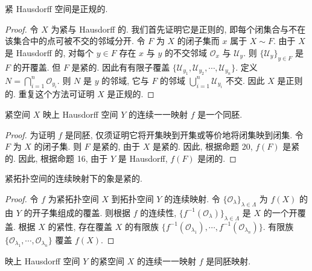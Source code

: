 \documentclass[../../main.tex]{subfiles}
\begin{document}
\begin{theorem}\label{theorem:ch11-紧Hausdorff正规}
紧 Hausdorff 空间是正规的.
\end{theorem}

\begin{proof}
令 $X$ 为紧与 Hausdorff 的. 我们首先证明它是正则的, 即每个闭集合与不在该集合中的点可被不交的邻域分开. 令 $F$ 为 $X$ 的闭子集而 $x$ 属于 $X\sim F$. 由于 $X$ 是 Hausdorff 的, 对每个 $y\in F$ 存在 $x$ 与 $y$ 的不交邻域 $\mathcal{O}_{x}$ 与 $\mathcal{U}_{y}$. 则 $\{\mathcal{U}_{y}\}_{y\in F}$ 是 $F$ 的开覆盖. 但 $F$ 是紧的. 因此有有限子覆盖 $\{\mathcal{U}_{y_{1}},\mathcal{U}_{y_{2}},\cdots,\mathcal{U}_{y_{n}}\}$. 定义 $N=\bigcap_{i=1}^{n}\mathcal{O}_{y_{i}}$. 则 $N$ 是 $y$ 的邻域, 它与 $F$ 的邻域 $\bigcup_{i=1}^{n}\mathcal{U}_{y_{i}}$ 不交. 因此 $X$ 是正则的. 重复这个方法可证明 $X$ 是正规的.
\end{proof}

\begin{proposition}\label{proposition:ch11-紧到Hausdorff一一同胚}
紧空间 $X$ 映上 Hausdorff 空间 $Y$ 的连续一一映射 $f$ 是一个同胚.
\end{proposition}

\begin{proof}
为证明 $f$ 是同胚, 仅须证明它将开集映到开集或等价地将闭集映到闭集. 令 $F$ 为 $X$ 的闭子集. 则 $F$ 是紧的, 由于 $X$ 是紧的. 因此, 根据命题 20, $f(F)$ 是紧的. 因此, 根据命题 16, 由于 $Y$ 是 Hausdorff, $f(F)$ 是闭的.
\end{proof}

\begin{proposition}\label{proposition:ch11-紧连续象}
紧拓扑空间的连续映射下的象是紧的.
\end{proposition}

\begin{proof}
令 $f$ 为紧拓扑空间 $X$ 到拓扑空间 $Y$ 的连续映射. 令 $\{\mathcal{O}_{\lambda}\}_{\lambda\in\Lambda}$ 为 $f(X)$ 的由 $Y$ 的开子集组成的覆盖. 则根据 $f$ 的连续性, $\{f^{-1}(\mathcal{O}_{\lambda})\}_{\lambda\in\Lambda}$ 是 $X$ 的一个开覆盖. 根据 $X$ 的紧性, 存在覆盖 $X$ 的有限族 $\{f^{-1}(\mathcal{O}_{\lambda_{1}}),\cdots,f^{-1}(\mathcal{O}_{\lambda_{n}})\}$. 有限族 $\{\mathcal{O}_{\lambda_{1}},\cdots,\mathcal{O}_{\lambda_{n}}\}$ 覆盖 $f(X)$.
\end{proof}

\begin{proposition}\label{proposition:ch11-紧到Hausdorff}
映上 Hausdorff 空间 $Y$ 的紧空间 $X$ 的连续一一映射 $f$ 是同胚映射.
\end{proposition}
\end{document}
